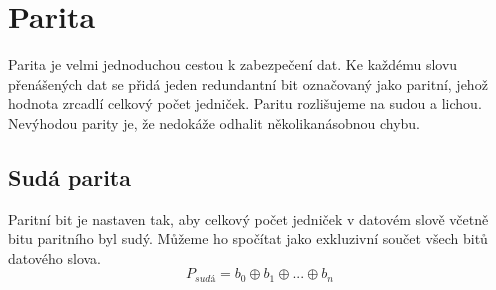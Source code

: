 
\section{Parita}
Parita je velmi jednoduchou cestou k zabezpečení dat. Ke každému slovu přenášených dat se přidá jeden redundantní bit označovaný jako paritní, jehož hodnota zrcadlí celkový počet jedniček. Paritu rozlišujeme na sudou a lichou. Nevýhodou parity je, že nedokáže odhalit několikanásobnou chybu.

\subsection{Sudá parita}
Paritní bit je nastaven tak, aby celkový počet jedniček v datovém slově včetně bitu paritního byl sudý. Můžeme ho spočítat jako exkluzivní součet všech bitů datového slova.
$$ P_{sudá} = b_0 \oplus b_1 \oplus ... \oplus b_n $$

